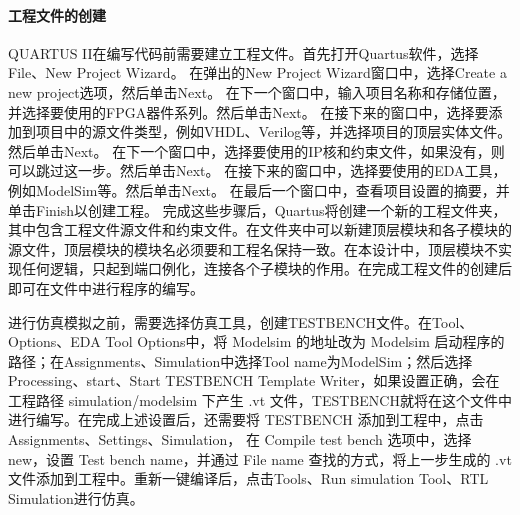 \paragraph{工程文件的创建}
QUARTUS II在编写代码前需要建立工程文件。首先打开Quartus软件，选择File、New Project Wizard。
在弹出的New Project Wizard窗口中，选择Create a new project选项，然后单击Next。
在下一个窗口中，输入项目名称和存储位置，并选择要使用的FPGA器件系列。然后单击Next。
在接下来的窗口中，选择要添加到项目中的源文件类型，例如VHDL、Verilog等，并选择项目的顶层实体文件。然后单击Next。
在下一个窗口中，选择要使用的IP核和约束文件，如果没有，则可以跳过这一步。然后单击Next。
在接下来的窗口中，选择要使用的EDA工具，例如ModelSim等。然后单击Next。
在最后一个窗口中，查看项目设置的摘要，并单击Finish以创建工程。
完成这些步骤后，Quartus将创建一个新的工程文件夹，其中包含工程文件源文件和约束文件。在文件夹中可以新建顶层模块和各子模块的源文件，顶层模块的模块名必须要和工程名保持一致。在本设计中，顶层模块不实现任何逻辑，只起到端口例化，连接各个子模块的作用。在完成工程文件的创建后即可在文件中进行程序的编写。\par
进行仿真模拟之前，需要选择仿真工具，创建TESTBENCH文件。在Tool、Options、EDA Tool Options中，将 Modelsim 的地址改为 Modelsim 启动程序的路径；在Assignments、Simulation中选择Tool name为ModelSim；然后选择Processing、start、Start TESTBENCH Template Writer，如果设置正确，会在工程路径 simulation/modelsim 下产生 .vt 文件，TESTBENCH就将在这个文件中进行编写。在完成上述设置后，还需要将 TESTBENCH 添加到工程中，点击Assignments、Settings、Simulation，
在 Compile test bench 选项中，选择 new，设置 Test bench name，并通过 File name 查找的方式，将上一步生成的 .vt 文件添加到工程中。重新一键编译后，点击Tools、Run simulation Tool、RTL Simulation进行仿真。

